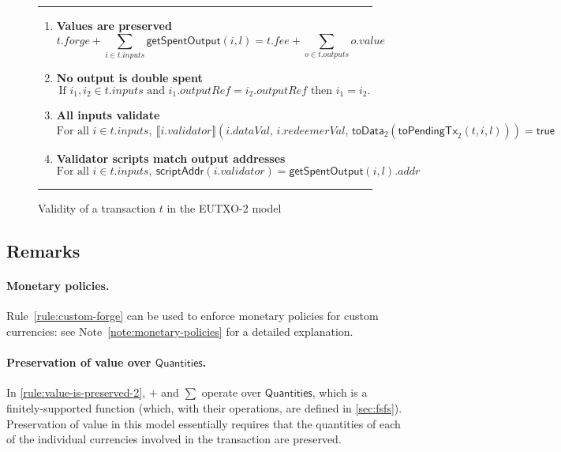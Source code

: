 \documentclass[a4paper]{article}
\newcounter{note}
\newcommand{\s}{\textsf}  %
\newcommand{\msf}[1]{\ensuremath{\mathsf{#1}}}
\newcommand{\mi}[1]{\ensuremath{\mathit{#1}}}
\newcommand\rfskip{7pt}
\newenvironment{ruledfigure}[1]{\begin{figure}[#1]\hrule\vspace{\rfskip}}{\vspace{\rfskip}\hrule\end{figure}}
\newcommand{\true}{\textsf{true}}
\newcommand{\scriptAddr}{\msf{scriptAddr}}
\newcommand{\toData}{\ensuremath{\s{toData}}}
\newcommand{\toPendingTx}{\ensuremath{\s{toPendingTx}}}
\newcommand{\inputs}{\mi{inputs}}
\newcommand{\outputs}{\mi{outputs}}
\newcommand{\forge}{\mi{forge}}
\newcommand{\fee}{\mi{fee}}
\newcommand{\addr}{\mi{addr}}
\newcommand{\val}{\mi{value}}  %
\newcommand{\validator}{\mi{validator}}
\newcommand{\redeemerVal}{\mi{redeemerVal}}
\newcommand{\dataVal}{\mi{dataVal}}
\newcommand{\outputref}{\mi{outputRef}}
\newcommand{\getSpent}{\msf{getSpentOutput}}
\newcommand{\qtymap}{\ensuremath{\s{Quantities}}}
\begin{document}
\begin{ruledfigure}{H}
\begin{enumerate}
\item
  \label{rule:value-is-preserved-2}
  \textbf{Values are preserved}
  \begin{displaymath}
    t.\forge + \sum_{i \in t.\inputs} \getSpent(i, l) = t.\fee + \sum_{o \in t.\outputs} o.\val
  \end{displaymath}

\item
  \label{rule:no-double-spending-2}
  \textbf{No output is double spent}
  \begin{displaymath}
    \textrm{If } i_1, i_2 \in t.\inputs \textrm{ and }  i_1.\outputref = i_2.\outputref
    \textrm{ then } i_1 = i_2.
  \end{displaymath}

\item
  \label{rule:all-inputs-validate-2}
  \textbf{All inputs validate}
  \begin{displaymath}
    \textrm{For all } i \in t.\inputs,\ \llbracket
    i.\validator\rrbracket(i.\dataVal,\, i.\redeemerVal,\, \toData_2(\toPendingTx_2(t, i, l))) = \true
  \end{displaymath}

\item
  \label{rule:validator-scripts-hash-2}
  \textbf{Validator scripts match output addresses}
  \begin{displaymath}
    \textrm{For all } i \in t.\inputs,\ \scriptAddr(i.\validator) = \getSpent(i, l).\addr
  \end{displaymath}

\end{enumerate}
\caption{Validity of a transaction $t$ in the EUTXO-2 model}
\label{fig:eutxo-2-validity}
\end{ruledfigure}

\subsection{Remarks}
\paragraph{Monetary policies.} 
Rule~\ref{rule:custom-forge} can be used to enforce monetary policies
for custom currencies: see Note~\ref{note:monetary-policies} for a
detailed explanation.

\paragraph{Preservation of value over \qtymap{}.}
In \cref{rule:value-is-preserved-2},
$+$ and $\sum$ operate over \qtymap{}, which is
a finitely-supported function (which, with their operations,
are defined in \cref{sec:fsfs}). Preservation of value
in this model essentially requires that the
quantities of each of the individual currencies involved in the
transaction are preserved.
\end{document}
